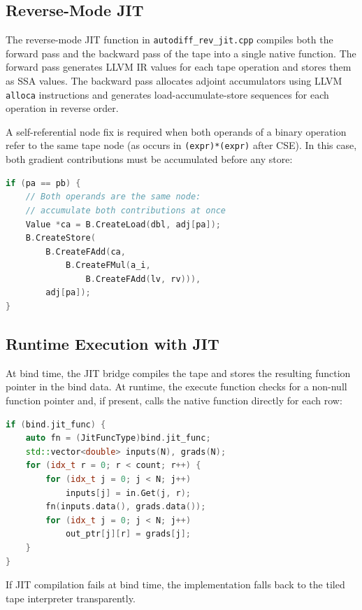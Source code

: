 \documentclass[12pt]{report}
\begin{document}
\subsection{Reverse-Mode JIT}

The reverse-mode JIT function in \texttt{autodiff\_rev\_jit.cpp} compiles both
the forward pass and the backward pass of the tape into a single native
function. The forward pass generates LLVM IR values for each tape operation
and stores them as SSA values. The backward pass allocates adjoint accumulators
using LLVM \texttt{alloca} instructions and generates load-accumulate-store
sequences for each operation in reverse order.

A self-referential node fix is required when both operands of a binary
operation refer to the same tape node (as occurs in \texttt{(expr)*(expr)}
after CSE). In this case, both gradient contributions must be accumulated
before any store:

\begin{lstlisting}[language=C++]
if (pa == pb) {
    // Both operands are the same node:
    // accumulate both contributions at once
    Value *ca = B.CreateLoad(dbl, adj[pa]);
    B.CreateStore(
        B.CreateFAdd(ca,
            B.CreateFMul(a_i,
                B.CreateFAdd(lv, rv))),
        adj[pa]);
}
\end{lstlisting}

\subsection{Runtime Execution with JIT}

At bind time, the JIT bridge compiles the tape and stores the resulting
function pointer in the bind data. At runtime, the execute function checks
for a non-null function pointer and, if present, calls the native function
directly for each row:

\begin{lstlisting}[language=C++]
if (bind.jit_func) {
    auto fn = (JitFuncType)bind.jit_func;
    std::vector<double> inputs(N), grads(N);
    for (idx_t r = 0; r < count; r++) {
        for (idx_t j = 0; j < N; j++)
            inputs[j] = in.Get(j, r);
        fn(inputs.data(), grads.data());
        for (idx_t j = 0; j < N; j++)
            out_ptr[j][r] = grads[j];
    }
}
\end{lstlisting}

If JIT compilation fails at bind time, the implementation falls back to the
tiled tape interpreter transparently.
\end{document}
